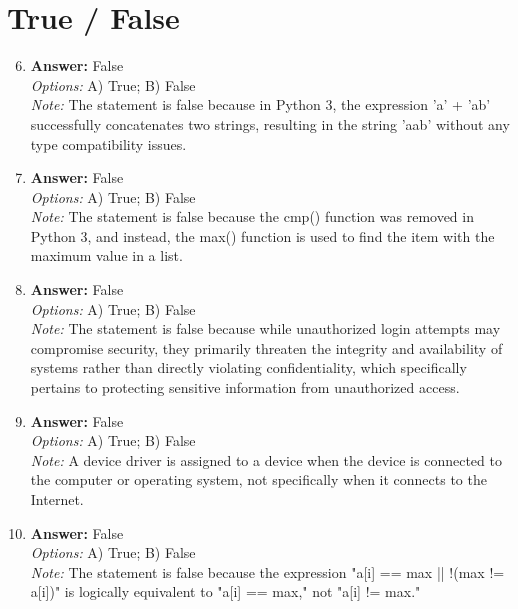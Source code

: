 \documentclass[12pt]{article}
\begin{document}
\section*{True / False}
\begin{enumerate}[label=\arabic*.]
\setcounter{enumi}{5}
\item \textbf{Answer:} False
\\ \textit{Options:} A) True; B) False
\\ \textit{Note:} The statement is false because in Python 3, the expression 'a' + 'ab' successfully concatenates two strings, resulting in the string 'aab' without any type compatibility issues.
\item \textbf{Answer:} False
\\ \textit{Options:} A) True; B) False
\\ \textit{Note:} The statement is false because the cmp() function was removed in Python 3, and instead, the max() function is used to find the item with the maximum value in a list.
\item \textbf{Answer:} False
\\ \textit{Options:} A) True; B) False
\\ \textit{Note:} The statement is false because while unauthorized login attempts may compromise security, they primarily threaten the integrity and availability of systems rather than directly violating confidentiality, which specifically pertains to protecting sensitive information from unauthorized access.
\item \textbf{Answer:} False
\\ \textit{Options:} A) True; B) False
\\ \textit{Note:} A device driver is assigned to a device when the device is connected to the computer or operating system, not specifically when it connects to the Internet.
\item \textbf{Answer:} False
\\ \textit{Options:} A) True; B) False
\\ \textit{Note:} The statement is false because the expression "a[i] == max || !(max != a[i])" is logically equivalent to "a[i] == max," not "a[i] != max."
\end{enumerate}
\end{document}
